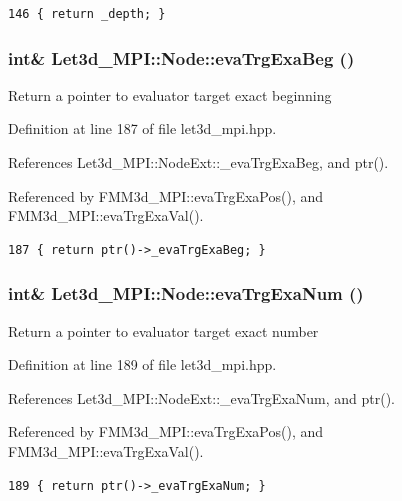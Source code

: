\footnotesize\begin{verbatim}146 { return _depth; }
\end{verbatim}\normalsize 


\subsubsection{\setlength{\rightskip}{0pt plus 5cm}int\& Let3d\_\-MPI::Node::eva\-Trg\-Exa\-Beg ()\hspace{0.3cm}{\tt  [inline]}}\label{classLet3d__MPI_1_1Node_1241a6beb10dcc222dabaef9838d7276_1241a6beb10dcc222dabaef9838d7276}


Return a pointer to evaluator target exact beginning 

Definition at line 187 of file let3d\_\-mpi.hpp.

References Let3d\_\-MPI::Node\-Ext::\_\-eva\-Trg\-Exa\-Beg, and ptr().

Referenced by FMM3d\_\-MPI::eva\-Trg\-Exa\-Pos(), and FMM3d\_\-MPI::eva\-Trg\-Exa\-Val().

\footnotesize\begin{verbatim}187 { return ptr()->_evaTrgExaBeg; }
\end{verbatim}\normalsize 


\subsubsection{\setlength{\rightskip}{0pt plus 5cm}int\& Let3d\_\-MPI::Node::eva\-Trg\-Exa\-Num ()\hspace{0.3cm}{\tt  [inline]}}\label{classLet3d__MPI_1_1Node_0c4926f1727c5327ef41d90db4bc40de_0c4926f1727c5327ef41d90db4bc40de}


Return a pointer to evaluator target exact number 

Definition at line 189 of file let3d\_\-mpi.hpp.

References Let3d\_\-MPI::Node\-Ext::\_\-eva\-Trg\-Exa\-Num, and ptr().

Referenced by FMM3d\_\-MPI::eva\-Trg\-Exa\-Pos(), and FMM3d\_\-MPI::eva\-Trg\-Exa\-Val().

\footnotesize\begin{verbatim}189 { return ptr()->_evaTrgExaNum; }
\end{verbatim}\normalsize 


